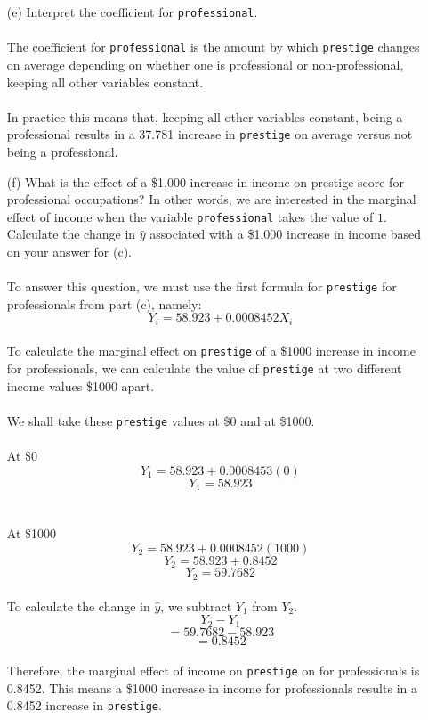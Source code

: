 \documentclass[12pt,letterpaper]{article}
\begin{document}
\begin{enumerate}
	\vspace{5cm}	
	\item [(e)]
	Interpret the coefficient for \texttt{professional}.
\\\\
\noindent The coefficient for \texttt{professional} is the amount by which \texttt{prestige} changes on average depending on whether one is professional or non-professional, keeping all other variables constant.
\\\\
\noindent In practice this means that, keeping all other variables constant, being a professional results in a 37.781 increase in \texttt{prestige} on average versus not being a professional.
	
	\newpage
	\item [(f)]
	What is the effect of a \$1,000 increase in income on prestige score for professional occupations? In other words, we are interested in the marginal effect of income when the variable \texttt{professional} takes the value of $1$. Calculate the change in $\hat{y}$ associated with a \$1,000 increase in income based on your answer for (c).
\\\\
\noindent To answer this question, we must use the first formula for \texttt{prestige} for professionals from part (c), namely:
\[Y_i = 58.923 + 0.0008452X_i\]
\\
\noindent To calculate the marginal effect on \texttt{prestige} of a \$1000 increase in income for professionals, we can calculate the value of \texttt{prestige} at two different income values \$1000 apart.
\\\\
\noindent We shall take these \texttt{prestige} values at \$0 and at \$1000.
\\\\
\noindent At \$0
\[Y_1 = 58.923 + 0.0008453(0)\]
\[Y_1 = 58.923\]
\\\\
\noindent At \$1000
\[Y_2 = 58.923 + 0.0008452(1000)\]
\[Y_2 = 58.923 + 0.8452\]
\[Y_2 = 59.7682\]
\\
\noindent To calculate the change in $\hat{y}$, we subtract $Y_1$ from $Y_2$.
\\
\[Y_2 - Y_1\]
\[= 59.7682 - 58.923\] 
\[= 0.8452\]
\\
\noindent Therefore, the marginal effect of income on \texttt{prestige} on for professionals is 0.8452. This means a \$1000 increase in income for professionals results in a 0.8452 increase in \texttt{prestige}.
	\vspace{10cm}
	

\end{enumerate}
\end{document}
